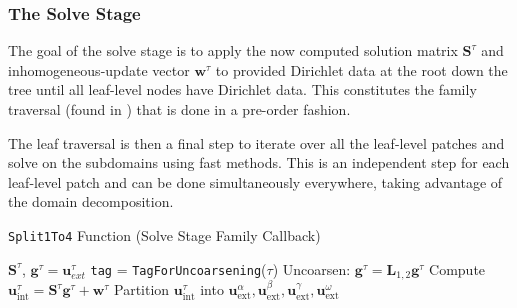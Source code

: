 \subsubsection{The Solve Stage}

The goal of the solve stage is to apply the now computed solution matrix $\textbf{S}^{\tau}$ and inhomogeneous-update vector $\textbf{w}^{\tau}$ to provided Dirichlet data at the root down the tree until all leaf-level nodes have Dirichlet data. This constitutes the family traversal (found in ) that is done in a pre-order fashion.

The leaf traversal is then a final step to iterate over all the leaf-level patches and solve  on the subdomains using fast methods. This is an independent step for each leaf-level patch and can be done simultaneously everywhere, taking advantage of the domain decomposition.

\begin{algorithm}
    \caption{\texttt{Split1To4} Function (Solve Stage Family Callback)}
    \begin{algorithmic}[0]
        \Require $\textbf{S}^{\tau}$, $\textbf{g}^{\tau} = \textbf{u}^{\tau}_{ext}$
        \State \texttt{tag} = \texttt{TagForUncoarsening}($\tau$)
            \State Uncoarsen: $\textbf{g}^{\tau} = \textbf{L}_{1,2} \textbf{g}^{\tau}$
        \EndIf
        \State Compute $\textbf{u}^{\tau}_{\text{int}} = \textbf{S}^{\tau} \textbf{g}^{\tau} + \textbf{w}^{\tau}$
        \State Partition $\textbf{u}^{\tau}_{\text{int}}$ into $\textbf{u}^{\alpha}_{\text{ext}}, \textbf{u}^{\beta}_{\text{ext}}, \textbf{u}^{\gamma}_{\text{ext}}, \textbf{u}^{\omega}_{\text{ext}}$
    \end{algorithmic}
    \label{alg:solve_split}
\end{algorithm}
